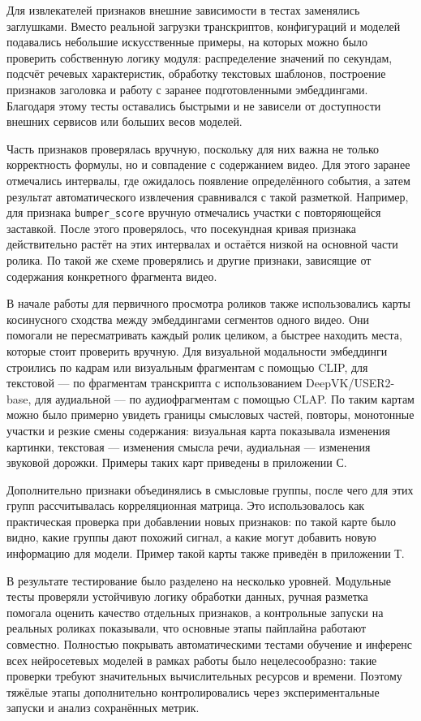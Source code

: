 \documentclass[times]{itmo-student-thesis}
\begin{document}
Для извлекателей признаков внешние зависимости в тестах заменялись заглушками. Вместо реальной загрузки транскриптов, конфигураций и моделей подавались небольшие искусственные примеры, на которых можно было проверить собственную логику модуля: распределение значений по секундам, подсчёт речевых характеристик, обработку текстовых шаблонов, построение признаков заголовка и работу с заранее подготовленными эмбеддингами. Благодаря этому тесты оставались быстрыми и не зависели от доступности внешних сервисов или больших весов моделей.

Часть признаков проверялась вручную, поскольку для них важна не только корректность формулы, но и совпадение с содержанием видео. Для этого заранее отмечались интервалы, где ожидалось появление определённого события, а затем результат автоматического извлечения сравнивался с такой разметкой. Например, для признака \texttt{bumper\_score} вручную отмечались участки с повторяющейся заставкой. После этого проверялось, что посекундная кривая признака действительно растёт на этих интервалах и остаётся низкой на основной части ролика. По такой же схеме проверялись и другие признаки, зависящие от содержания конкретного фрагмента видео.

В начале работы для первичного просмотра роликов также использовались карты косинусного сходства между эмбеддингами сегментов одного видео. Они помогали не пересматривать каждый ролик целиком, а быстрее находить места, которые стоит проверить вручную. Для визуальной модальности эмбеддинги строились по кадрам или визуальным фрагментам с помощью CLIP, для текстовой — по фрагментам транскрипта с использованием DeepVK/USER2-base, для аудиальной — по аудиофрагментам с помощью CLAP. По таким картам можно было примерно увидеть границы смысловых частей, повторы, монотонные участки и резкие смены содержания: визуальная карта показывала изменения картинки, текстовая — изменения смысла речи, аудиальная — изменения звуковой дорожки. Примеры таких карт приведены в приложении С.

Дополнительно признаки объединялись в смысловые группы, после чего для этих групп рассчитывалась корреляционная матрица. Это использовалось как практическая проверка при добавлении новых признаков: по такой карте было видно, какие группы дают похожий сигнал, а какие могут добавить новую информацию для модели. Пример такой карты также приведён в приложении Т.

В результате тестирование было разделено на несколько уровней. Модульные тесты проверяли устойчивую логику обработки данных, ручная разметка помогала оценить качество отдельных признаков, а контрольные запуски на реальных роликах показывали, что основные этапы пайплайна работают совместно. Полностью покрывать автоматическими тестами обучение и инференс всех нейросетевых моделей в рамках работы было нецелесообразно: такие проверки требуют значительных вычислительных ресурсов и времени. Поэтому тяжёлые этапы дополнительно контролировались через экспериментальные запуски и анализ сохранённых метрик.
\end{document}
